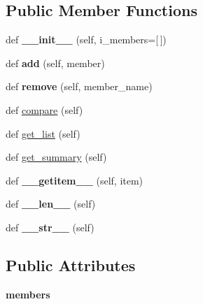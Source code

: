 \subsection*{Public Member Functions}
\begin{DoxyCompactItemize}
\item 
def {\bfseries \+\_\+\+\_\+init\+\_\+\+\_\+} (self, i\+\_\+members=\mbox{[}$\,$\mbox{]})\hypertarget{classatod_1_1interfaces_1_1_group_a42cd06857f6d9794d9314331c48d59bc}{}\label{classatod_1_1interfaces_1_1_group_a42cd06857f6d9794d9314331c48d59bc}

\item 
def {\bfseries add} (self, member)\hypertarget{classatod_1_1interfaces_1_1_group_a837162f848dea73b4fbb97fc43462096}{}\label{classatod_1_1interfaces_1_1_group_a837162f848dea73b4fbb97fc43462096}

\item 
def {\bfseries remove} (self, member\+\_\+name)\hypertarget{classatod_1_1interfaces_1_1_group_ac6ff24627bb35c20bdf53917db4ffccd}{}\label{classatod_1_1interfaces_1_1_group_ac6ff24627bb35c20bdf53917db4ffccd}

\item 
def \hyperlink{classatod_1_1interfaces_1_1_group_a5797ab75458b8a02fa05ba18415fc177}{compare} (self)
\item 
def \hyperlink{classatod_1_1interfaces_1_1_group_a024fa38236c8b271766bdfba3c426862}{get\+\_\+list} (self)
\item 
def \hyperlink{classatod_1_1interfaces_1_1_group_a4f8f899361148523842186e7822f6534}{get\+\_\+summary} (self)
\item 
def {\bfseries \+\_\+\+\_\+getitem\+\_\+\+\_\+} (self, item)\hypertarget{classatod_1_1interfaces_1_1_group_a79995ea461a23acd3eb633908a26aaca}{}\label{classatod_1_1interfaces_1_1_group_a79995ea461a23acd3eb633908a26aaca}

\item 
def {\bfseries \+\_\+\+\_\+len\+\_\+\+\_\+} (self)\hypertarget{classatod_1_1interfaces_1_1_group_adf5a671a4381821232ff047ed8ae19f3}{}\label{classatod_1_1interfaces_1_1_group_adf5a671a4381821232ff047ed8ae19f3}

\item 
def {\bfseries \+\_\+\+\_\+str\+\_\+\+\_\+} (self)\hypertarget{classatod_1_1interfaces_1_1_group_a85b3c25f20a5d8d355ee214ec90e911c}{}\label{classatod_1_1interfaces_1_1_group_a85b3c25f20a5d8d355ee214ec90e911c}

\end{DoxyCompactItemize}
\subsection*{Public Attributes}
\begin{DoxyCompactItemize}
\item 
{\bfseries members}\hypertarget{classatod_1_1interfaces_1_1_group_af72b66e3c59a9914f3d62d337386836a}{}\label{classatod_1_1interfaces_1_1_group_af72b66e3c59a9914f3d62d337386836a}

\end{DoxyCompactItemize}
